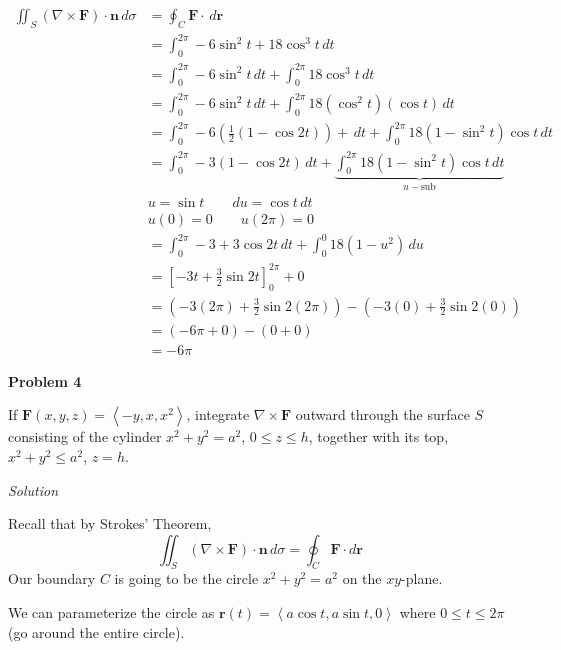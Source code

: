 \documentclass{article}
\newcommand{\lrp}[1]{\left( #1 \right)}
\newcommand{\lra}[1]{\left\langle #1 \right\rangle}
\newcommand{\lrb}[1]{\left[ #1 \right]}
\renewcommand{\r}[0]{\mathbf{r}}
\newcommand{\F}[0]{\mathbf{F}}
\newcommand{\n}[0]{\mathbf{n}}
\newcommand{\Solution}{\textit{Solution}}
\begin{document}
\begin{align*}
    \iint_S \lrp{\nabla \times \F}\cdot \n\,d\sigma&=\oint_C \F\cdot \,d\r\\
    &=\int_0^{2\pi}-6\sin^2 t + 18\cos^3 t\,dt\\
    &=\int_0^{2\pi}-6\sin^2 t\,dt + \int_0^{2\pi} 18\cos^3t \,dt\tag{we can break up integrals}\\
    &=\int_0^{2\pi}-6\sin^2 t\,dt + \int_0^{2\pi} 18(\cos ^2 t)(\cos t) \,dt\\
    &=\int_0^{2\pi}-6\lrp{\frac{1}{2}\lrp{1-\cos 2t}}+ \,dt + \int_0^{2\pi} 18\lrp{1-\sin^2 t}\cos t\,dt\tag{trig laws}\\
    &=\int_0^{2\pi} -3(1-\cos 2t)\,dt+\underbrace{\int_0^{2\pi}18(1-\sin^2 t)\cos t\,dt}_{u-\text{sub}}\\
    &u=\sin t \hspace{2em}du=\cos t\,dt\\
    &u(0)=0\hspace{2em}u(2\pi)= 0\\
    &=\int_0^{2\pi} -3 + 3\cos 2t\,dt + \int_0^0 18(1-u^2)\,du\\
    &=\lrb{-3t +\frac{3}{2}\sin 2t}_0^{2\pi}+0\tag{integral from $0$ to $0$ is $0$}\\
    &=\lrp{-3(2\pi)+\frac{3}{2}\sin2(2\pi)}-\lrp{-3(0)+\frac{3}{2}\sin 2(0)}\\
    &=\lrp{-6\pi+0}-\lrp{0+0}\\
    &=\boxed{-6\pi}
\end{align*}

{}\textbf{Problem 4}

If $\F(x,y,z)=\lra{-y,x,x^2}$, integrate $\nabla \times \F$ outward through the surface $S$ consisting of the cylinder $x^2+y^2=a^2$, $0\leq z\leq h$, together with its top, $x^2+y^2\leq a^2$, $z=h$.

\Solution

Recall that by Strokes' Theorem,
\begin{equation*}
    \iint_S \lrp{\nabla \times \F}\cdot \n\,d\sigma = \oint_C \F\cdot d\r
\end{equation*}
Our boundary $C$ is going to be the circle $x^2+y^2=a^2$ on the $xy$-plane.

We can parameterize the circle as $\r(t)=\lra{a\cos t, a\sin t,0}$ where $0\leq t \leq 2\pi$ (go around the entire circle).
\end{document}
